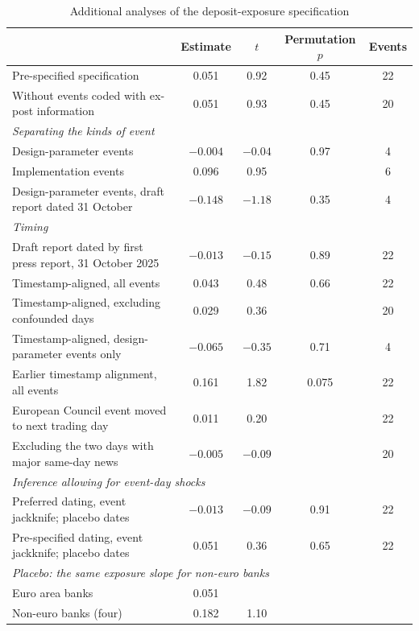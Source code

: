 \documentclass[11pt]{article}
\theoremstyle{plain}\newtheorem{proposition}{Proposition}
\begin{document}
\begin{table}[t]\centering\small
\begin{threeparttable}
\caption{Additional analyses of the deposit-exposure specification}\label{tab:referee}
\begin{tabular}{lcccc}
\toprule
& Estimate & $t$ & Permutation $p$ & Events \\
\midrule
Pre-specified specification & 0.051 & 0.92 & 0.45 & 22 \\
Without events coded with ex-post information & 0.051 & 0.93 & 0.45 & 20 \\[3pt]
\multicolumn{5}{l}{\textit{Separating the kinds of event}} \\
\quad Design-parameter events & $-0.004$ & $-0.04$ & 0.97 & 4 \\
\quad Implementation events & 0.096 & 0.95 & & 6 \\
\quad Design-parameter events, draft report dated 31 October & $-0.148$ & $-1.18$ & 0.35 & 4 \\[3pt]
\multicolumn{5}{l}{\textit{Timing}} \\
\quad Draft report dated by first press report, 31 October 2025 & $-0.013$ & $-0.15$ & 0.89 & 22 \\
\quad Timestamp-aligned, all events & 0.043 & 0.48 & 0.66 & 22 \\
\quad Timestamp-aligned, excluding confounded days & 0.029 & 0.36 & & 20 \\
\quad Timestamp-aligned, design-parameter events only & $-0.065$ & $-0.35$ & 0.71 & 4 \\
\quad Earlier timestamp alignment, all events & 0.161 & 1.82 & 0.075 & 22 \\
\quad European Council event moved to next trading day & 0.011 & 0.20 & & 22 \\
\quad Excluding the two days with major same-day news & $-0.005$ & $-0.09$ & & 20 \\[3pt]
\multicolumn{5}{l}{\textit{Inference allowing for event-day shocks}} \\
\quad Preferred dating, event jackknife; placebo dates & $-0.013$ & $-0.09$ & 0.91 & 22 \\
\quad Pre-specified dating, event jackknife; placebo dates & 0.051 & 0.36 & 0.65 & 22 \\[3pt]
\multicolumn{5}{l}{\textit{Placebo: the same exposure slope for non-euro banks}} \\
\quad Euro area banks & 0.051 & & & \\
\quad Non-euro banks (four) & 0.182 & 1.10 & & \\

\end{tabular}
\end{threeparttable}
\end{table}
\end{document}
